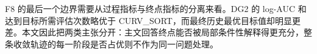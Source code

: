F8 的最后一个边界需要从过程指标与终点指标的分离来看。DG2 的 log-AUC 和达到目标所需评估次数略优于 CURV\_SORT，而最终历史最优目标值却明显更差。本文因此把两类主张分开：主文回答终点能否被局部条件性解释得更充分，整条收敛轨迹的每一阶段是否占优则不作为同一问题处理。